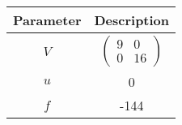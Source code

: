 \begin{tabular}[12pt]{ |c|c|}
    \hline
    Parameter & Description\\ 
    \hline
    $V$ & $\begin{pmatrix} 9 & 0 \\ 0 & 16 \end{pmatrix}$ \\
    \hline
    $u$ & 0\\
    \hline
    $f$ & -144\\
    \hline
    \end{tabular}
